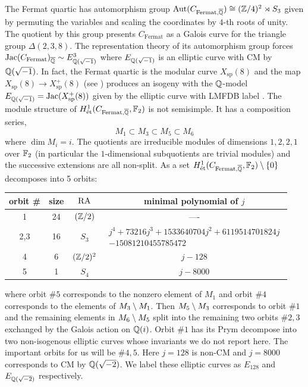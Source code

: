 \documentclass[main.tex]{subfiles}
\begin{document}
The Fermat quartic has automorphism group $\operatorname{\mathrm{Aut}}(C_{\mathrm{Fermat}, \overline{\mathbb{Q}}}) \cong (\mathbb{Z} / 4)^2 \rtimes S_3$ given by permuting the variables and scaling the coordinates by $4$-th roots of unity. The quotient by this group presents $C_{\mathrm{Fermat}}$ as a Galois \Belyi curve for the triangle group $\Delta(2,3,8)$. The representation theory of its automorphism group forces $\operatorname{\mathrm{Jac}}(C_{\mathrm{Fermat}})_{\overline{\mathbb{Q}}} \sim E_{\mathbb{Q}(\sqrt{-1})}^3$ where $E_{\mathbb{Q}(\sqrt{-1})}$ is an elliptic curve with CM by $\mathbb{Q}(\sqrt{-1})$. In fact, the Fermat quartic is the modular curve $X_{\mathrm{sp}}(8)$ and the map $X_{\mathrm{sp}}(8) \to X_{\mathrm{sp}}^+(8)$ (see \cite{lmfdb:mc-8.48.1.bv.1}) produces an isogeny with the $\mathbb{Q}$-model $E_{\mathbb{Q}(\sqrt{-1})} = \operatorname{\mathrm{Jac}}(X_{\mathrm{sp}}^+(8))$ given by the elliptic curve with LMFDB label \cite{lmfdb:ec-32.a1}.
The module structure of $H^1_{\mathrm{\acute{e}t}}(C_{\mathrm{Fermat}, \overline{\mathbb{Q}}}, \mathbb{F}_2)$ is not semisimple. It has a composition series,
\[ M_1 \subset M_3 \subset M_5 \subset M_6 \]
where $\dim{M_i} = i$. The quotients are irreducible modules of dimensions $1,2,2,1$ over $\mathbb{F}_2$ (in particular the $1$-dimensional subquotients are trivial modules) and the successive extensions are all non-split. As a set $H^1_{\mathrm{\acute{e}t}}(C_{\mathrm{Fermat}, \overline{\mathbb{Q}}}, \mathbb{F}_2) \setminus \{ 0 \}$ decomposes into 5 orbits:
\begin{center} \label{table:Fermat_orbits}
\begin{tabular}{c|c|c|c}
orbit \# & size & $\operatorname{\mathrm{RA}}$ & minimal polynomial of $j$
\\
\hline
1 & 24 & $(\mathbb{Z}/2)$ & ----
\\
2,3 & 16 & $S_3$ & $\substack{j^4 + 73216 j^3 + 1533640704 j^2 + 6119514701824 j \\ - 15081210455785472}$
\\
4 & 6 & $(\mathbb{Z} / 2)^2$ & $j - 128$
\\
5 & 1 & $S_4$ & $j - 8000$
\end{tabular}
\end{center}
where orbit $\#5$ corresponds to the nonzero element of $M_1$ and orbit $\# 4$ corresponds to the elements of $M_3 \setminus M_1$. Then $M_5 \setminus M_3$ corresponds to orbit $\#1$ and the remaining elements in $M_6 \setminus M_5$ split into the remaining two orbits $\# 2,3$ exchanged by the Galois action on $\mathbb{Q}(i)$. Orbit $\# 1$ has its Prym decompose into two non-isogenous elliptic curves whose invariants we do not report here. The important orbits for us will be $\# 4,5$. Here $j = 128$ is non-CM and $j = 8000$ corresponds to CM by $\mathbb{Q}(\sqrt{-2})$. We label these elliptic curves as $E_{128}$ and $E_{\mathbb{Q}(\sqrt{-2})}$ respectively. 
\end{document}

